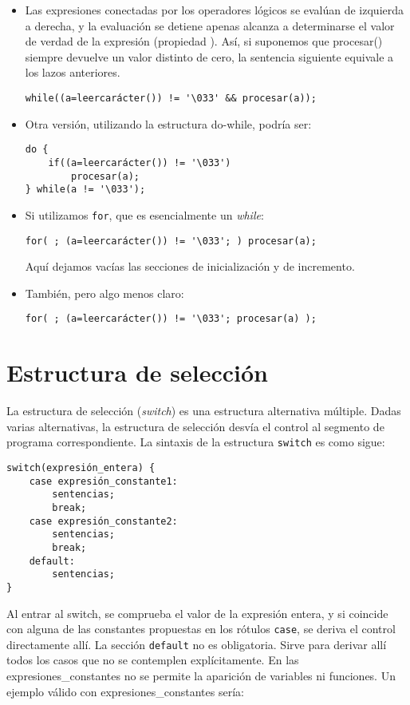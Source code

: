 \begin{ejemplo}
\begin{itemize}
\item Las expresiones conectadas por los operadores lógicos se evalúan de izquierda a
derecha, y la evaluación se detiene apenas alcanza a determinarse el valor de
verdad de la expresión (propiedad ). Así, si suponemos que
procesar() siempre devuelve un valor distinto de cero, la sentencia siguiente equivale a los lazos anteriores.

\begin{lstlisting}
while((a=leercarácter()) != '\033' && procesar(a));
\end{lstlisting}
\item Otra versión, utilizando la estructura do-while, podría ser:
\begin{lstlisting}
do {
    if((a=leercarácter()) != '\033')
        procesar(a);
} while(a != '\033');
\end{lstlisting}

\item Si utilizamos \lstinline{for}, que es esencialmente un \textit{while}:

\begin{lstlisting}
for( ; (a=leercarácter()) != '\033'; ) procesar(a);
\end{lstlisting}

Aquí dejamos vacías las secciones de inicialización y de incremento. 
\item También, pero algo menos claro:

\begin{lstlisting}
for( ; (a=leercarácter()) != '\033'; procesar(a) );
\end{lstlisting}
\end{itemize}
\end{ejemplo}

\section{Estructura de selección}

La estructura de selección (\textit{switch}) es una estructura alternativa múltiple. Dadas varias alternativas, la estructura de selección desvía el control al
segmento de programa correspondiente. La sintaxis de la estructura \lstinline{switch} es
como sigue:
\begin{lstlisting}
switch(expresión_entera) {
    case expresión_constante1:
        sentencias;
        break;
    case expresión_constante2:
        sentencias;
        break;
    default:
        sentencias;
}
\end{lstlisting}
Al entrar al switch, se comprueba el valor de la expresión entera, y si
coincide con alguna de las constantes propuestas en los rótulos \lstinline{case}, se deriva
el control directamente allí. La sección \lstinline{default} no es obligatoria. Sirve para
derivar allí todos los casos que no se contemplen explícitamente.
En las expresiones\_constantes no se permite la aparición de variables ni
funciones. Un ejemplo válido con expresiones\_constantes sería:

